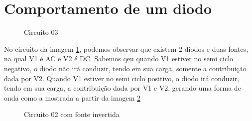 \section{Comportamento de um diodo}

\begin{figure}[H]
    \centering
    \caption{Circuito 03}
    \vspace{-0.3cm}
    \label{fig:circuito_04}
\end{figure}

No circuito da imagem \ref{fig:circuito_04}, podemos observar que existem 2 diodos e duas fontes, na qual V1 é AC e V2 é DC. Sabemos qeu quando V1 estiver no semi ciclo negativo, o diodo não irá conduzir, tendo em sua carga, somente a contribuição dada por V2. Quando V1 estiver no semi ciclo positivo, o diodo irá conduzir, tendo em sua carga, a contribuição dada por V1 e V2, gerando uma forma de onda como a mostrada a partir da imagem \ref{fig:forma_de_onda_circuito_04}

\begin{figure}[H]
    \centering
    \caption{Circuito 02 com fonte invertida}
    \vspace{-0.3cm}
    \label{fig:forma_de_onda_circuito_04}
\end{figure}

